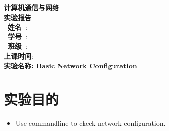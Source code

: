 \documentclass[a4paper]{ctexart}
\begin{document}
  \begin{titlepage}
      \songti
      \begin{center}
        \vspace*{2cm}
        {\fontsize{24pt}{0}
          \textbf{计算机通信与网络\\实验报告\\}
        }
        \vspace*{10cm}
        {\fontsize{16pt}{0}
          \textbf{\ 姓\quad 名\ }: \underline{}\\
          \textbf{\ 学\quad 号\ }: \underline{}\\
          \textbf{\ 班\quad 级\ }: \underline{}\\
          \textbf{上课时间}: \underline{}\\
        }
        \vspace*{7cm}
        {\fontsize{16pt}{0}
          \textbf{实验名称: {\Large Basic Network Configuration}}
        }
      \end{center}
  \end{titlepage}


  \newpage
  \section{实验目的}
    \begin{itemize}
      \item Use commandline to check network configuration.
    \end{itemize}
\end{document}
